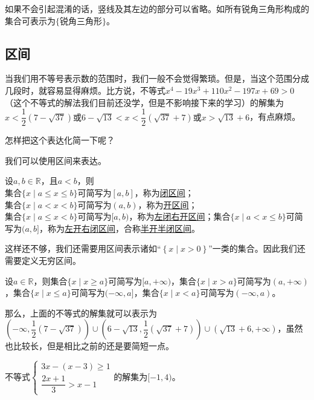 \documentclass[lang=cn,math=cm,chinesefont=nofont,11pt,scheme=chinese,onecol]{elegantbook}
\begin{document}
如果不会引起混淆的话，竖线及其左边的部分可以省略。如所有锐角三角形构成的集合可表示为$\{\text{锐角三角形}\}$。

\subsection{区间}
当我们用不等号表示数的范围时，我们一般不会觉得繁琐。但是，当这个范围分成几段时，就容易显得麻烦。比方说，不等式$x^4-19x^3+110x^2-197x+69>0$（这个不等式的解法我们目前还没学，但是不影响接下来的学习）的解集为$x<\dfrac{1}{2} \left(7-\sqrt{37}\right)\text{或}6-\sqrt{13}<x<\dfrac{1}{2} \left(\sqrt{37}+7\right)\text{或}x>\sqrt{13}+6$，有点麻烦。

怎样把这个表达化简一下呢？

我们可以使用区间来表达。

\begin{definition}[区间]
	设$a,b\in\mathbb{R}$，且$a<b$，则\\集合$\{x\mid a\leq x\leq b\}$可简写为$[a,b]$，称为\underline{闭区间}；\\集合$\{x\mid a<x<b\}$可简写为$(a,b)$，称为\underline{开区间}；\\集合$\{x\mid a\leq x<b\}$可简写为$[a,b)$，称为\underline{左闭右开区间}；集合$\{x\mid a< x\leq b\}$可简写为$(a,b]$，称为\underline{左开右闭区间}，合称\underline{半开半闭区间}。
\end{definition}

这样还不够，我们还需要用区间表示诸如“$\left\{x\mid x>0\right\}$”一类的集合。因此我们还需要定义无穷区间。

\begin{definition}[无穷区间]
    设$a\in\mathbb{R}$，则集合$\{x\mid x\geq a\}$可简写为$[a,+\infty)$，集合$\{x\mid x>a\}$可简写为$(a,+\infty)$，集合$\{x\mid x\leq a\}$可简写为$(-\infty,a]$，集合$\{x\mid x<a\}$可简写为$(-\infty,a)$。
\end{definition}

那么，上面的不等式的解集就可以表示为$(-\infty,\dfrac{1}{2} \left(7-\sqrt{37}\right))\cup (6-\sqrt{13},\dfrac{1}{2} \left(\sqrt{37}+7\right))\cup (\sqrt{13}+6,+\infty)$，虽然也比较长，但是相比之前的还是要简短一点。

\begin{example}
  不等式$\begin{cases}3x-(x-3)\geqslant1\\\dfrac{2x+1}{3}>x-1\end{cases}$的解集为$[-1,4)$。
\end{example}
\end{document}
